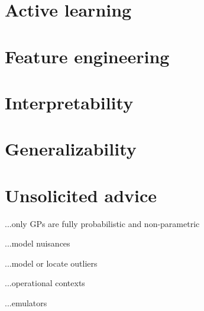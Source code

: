 \documentclass[12pt, letterpaper]{article}
\begin{document}
\section{Active learning}

\section{Feature engineering}

\section{Interpretability}

\section{Generalizability}

\section{Unsolicited advice}

...only GPs are fully probabilistic and non-parametric

...model nuisances

...model or locate outliers

...operational contexts

...emulators
\end{document}
